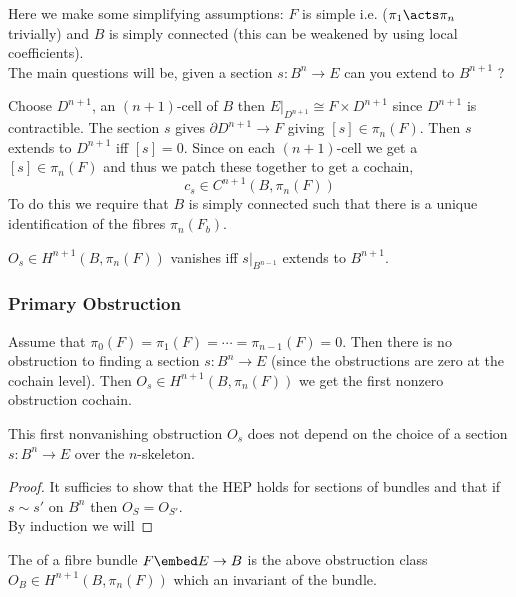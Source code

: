 \documentclass[12pt]{extarticle}
\begin{document}
\begin{rmk}
Here we make some simplifying assumptions: $F$ is simple i.e. ($\pi_1 \acts \pi_n$ trivially) and $B$ is simply connected (this can be weakened by using local coefficients).  
\bigskip\\
The main questions will be, given a section $s : B^n \to E$ can you extend to $B^{n+1}$ ?
\end{rmk}

Choose $D^{n+1}$, an $(n+1)$-cell of $B$ then $E|_{D^{n+1}} \cong F \times D^{n+1}$ since $D^{n+1}$ is contractible. The section $s$ gives $\partial D^{n+1} \to F$ giving $[s] \in \pi_n(F)$. Then $s$ extends to $D^{n+1}$ iff $[s] = 0$. Since on each $(n+1)$-cell we get a $[s] \in \pi_n(F)$ and thus we patch these together to get a cochain,
\[ c_s \in C^{n+1}(B, \pi_n(F)) \]
To do this we require that $B$ is simply connected such that there is a unique identification of the fibres $\pi_n(F_b)$. 

\begin{thm}
$O_s \in H^{n+1}(B, \pi_n(F))$ vanishes iff $s|_{B^{n-1}}$ extends to $B^{n+1}$. 
\end{thm}

\subsubsection{Primary Obstruction}

Assume that $\pi_0(F) = \pi_1(F) = \cdots = \pi_{n-1}(F) = 0$. Then there is no obstruction to finding a section $s : B^n \to E$ (since the obstructions are zero at the cochain level). Then $O_s \in H^{n+1}(B, \pi_n(F))$ we get the first nonzero obstruction cochain.

\begin{prop}
This first nonvanishing obstruction $O_s$ does not depend on the choice of a section $s : B^n \to E$ over the $n$-skeleton.
\end{prop}

\begin{proof}
It sufficies to show that the HEP holds for sections of bundles and that if $s \sim s'$ on $B^n$ then $O_S = O_{S'}$. 
\bigskip\\
By induction we will 
\end{proof}

\begin{definition}
The  of a fibre bundle $F \embed E \to B$ is the above obstruction class $O_B \in H^{n+1}(B, \pi_n(F))$ which an invariant of the bundle. 
\end{definition}
\end{document}
